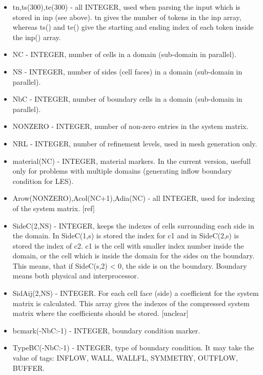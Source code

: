 \documentclass[10pt]{article}
\newcommand*{\tc}{\ttfamily} %
\begin{document}
\begin{itemize}
    \item
    {\tc tn,ts(300),te(300)} - all INTEGER, used when parsing the input
      which is stored in inp (see above). tn gives the number of 
      tokens in the inp array, whereas ts() and te() give the starting
      and ending index of each token inside the inp() array.

    \item
    {\tc NC} - INTEGER, number of cells in a domain (sub-domain in parallel).

    \item
    {\tc NS} - INTEGER, number of sides (cell faces) in a domain (sub-domain 
      in parallel).

    \item
    {\tc NbC} - INTEGER, number of boundary cells in a domain (sub-domain in 
      parallel).

    \item
    {\tc NONZERO} - INTEGER, number of non-zero entries in the system matrix.    

    \item
    {\tc NRL} - INTEGER, number of refinement levels, used in mesh generation
      only.

    \item
    {\tc material(NC)} - INTEGER, material markers. In the current version,
      usefull only for problems with multiple domains (generating inflow
      boundary condition for LES).  

    \item
    {\tc Arow(NONZERO),Acol(NC+1),Adia(NC)} - all INTEGER, used for
      indexing of the system matrix. [ref]

    \item
    {\tc SideC(2,NS)} - INTEGER, keeps the indexes of cells surrounding
      each side in the domain. In SideC(1,s) is stored the index for
      {\tc c1} and in {\tc SideC(2,s)} is stored the index of {\tc c2}. 
      {\tc c1} is the cell
      with smaller index number inside the domain, or the cell which
      is inside the domain for the sides on the boundary. This means,
      that if {\tc SideC(s,2) < 0}, the side is on the boundary. Boundary 
      means both physical and interprocessor. 

    \item
    {\tc SidAij(2,NS)} - INTEGER. For each cell face (side) a coefficient
      for the system matrix is calculated. This array gives the indexes
      of the compressed system matrix where the coefficients should be
      stored. [unclear]

    \item
    {\tc bcmark(-NbC:-1)} - INTEGER, boundary condition marker.

    \item
    {\tc TypeBC(-NbC:-1)} - INTEGER, type of boundary condition. It may take 
      the value of tags: INFLOW, WALL, WALLFL, SYMMETRY, OUTFLOW, BUFFER. 

    \end{itemize} 
\end{document}
